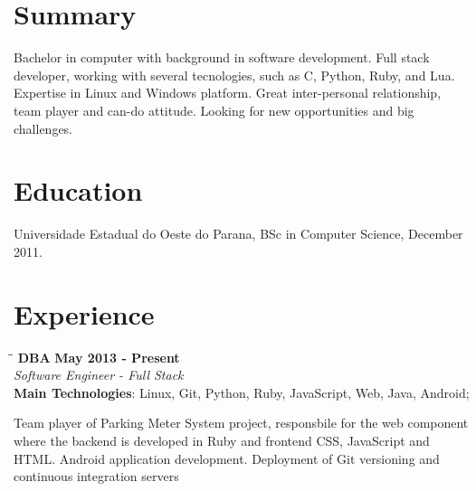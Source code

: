 \documentclass[margin]{res}
\begin{document}
  

\address{Brazil, BR \\ cadicallegari@gmail.com \\ Phone: +55 (48) 9826 4067}
                           
                        
\begin{resume}                        
 
\section{Summary}       Bachelor in computer with background in software development. Full stack developer, working with
                        several tecnologies, such as C, Python, Ruby, and Lua. Expertise in Linux and Windows platform.
                        Great inter-personal relationship, team player and can-do attitude. Looking for new opportunities
                        and big challenges.                        
 
\section{Education}	Universidade Estadual do Oeste do Parana, BSc in Computer Science, December 2011.
  
\section{Experience}

\vspace{-0.1in}
   \begin{tabbing}
   \hspace{2.3in}\= \hspace{1.7in}\= \kill %
    \textbf{DBA}    \>\>\textbf{May 2013 - Present}\\
    \textit{Software Engineer - Full Stack}\\        
    \textbf{Main Technologies}: Linux, Git, Python, Ruby, JavaScript, Web, Java, Android;
   \end{tabbing}\vspace{-20pt}      %
    \vspace{2mm}
    Team player of Parking Meter System project, responsbile for the web component where the backend is developed in Ruby
    and frontend CSS, JavaScript and HTML. Android application development. Deployment of Git versioning and continuous 
    integration servers
        

\end{resume}
\end{document}
